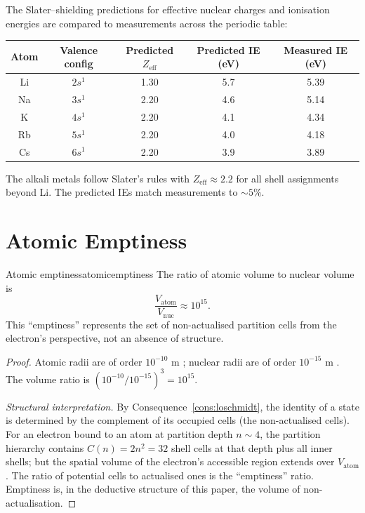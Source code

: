 The Slater--shielding predictions for effective nuclear charges and ionisation energies are compared to measurements across the periodic table:
\begin{center}
\begin{tabular}{c|c|c|c|c}
\toprule
Atom & Valence config & Predicted $Z_{\text{eff}}$ & Predicted IE (eV) & Measured IE (eV)\\
\midrule
Li & $2s^{1}$ & 1.30 & 5.7 & 5.39 \\
Na & $3s^{1}$ & 2.20 & 4.6 & 5.14 \\
K  & $4s^{1}$ & 2.20 & 4.1 & 4.34 \\
Rb & $5s^{1}$ & 2.20 & 4.0 & 4.18 \\
Cs & $6s^{1}$ & 2.20 & 3.9 & 3.89 \\
\bottomrule
\end{tabular}
\end{center}
The alkali metals follow Slater's rules with $Z_{\text{eff}}\approx 2.2$ for all shell assignments beyond Li. The predicted IEs match measurements to $\sim 5\%$.

\section{Atomic Emptiness}
\label{sec:atomicemptiness}

\begin{consequence}{Atomic emptiness}{atomicemptiness}
The ratio of atomic volume to nuclear volume is
\begin{equation}
\frac{V_{\text{atom}}}{V_{\text{nuc}}}\approx 10^{15}.
\label{eq:emptiness}
\end{equation}
This ``emptiness'' represents the set of non-actualised partition cells from the electron's perspective, not an absence of structure.
\end{consequence}

\begin{proof}
Atomic radii are of order $10^{-10}$ m \citep{nistasd}; nuclear radii are of order $10^{-15}$ m \citep{hofstadter1956}. The volume ratio is $(10^{-10}/10^{-15})^{3}=10^{15}$.

\emph{Structural interpretation.} By Consequence~\ref{cons:loschmidt}, the identity of a state is determined by the complement of its occupied cells (the non-actualised cells). For an electron bound to an atom at partition depth $n\sim 4$, the partition hierarchy contains $C(n)=2n^{2}=32$ shell cells at that depth plus all inner shells; but the spatial volume of the electron's accessible region extends over $V_{\text{atom}}$. The ratio of potential cells to actualised ones is the ``emptiness'' ratio. Emptiness is, in the deductive structure of this paper, the volume of non-actualisation.
\end{proof}

